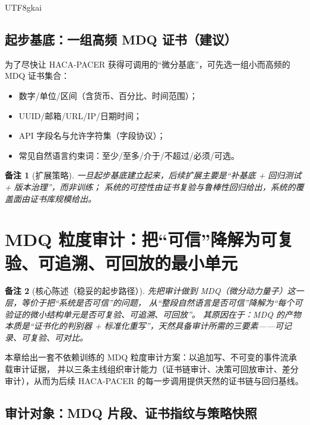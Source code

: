 \documentclass[12pt]{article}
\newtheorem{remark}{备注}[section]
\begin{document}
\begin{CJK*}{UTF8}{gkai}
\subsection{起步基底：一组高频 MDQ 证书（建议）}
\label{subsec:bootstrap-basis}

为了尽快让 HACA-PACER 获得可调用的“微分基底”，可先选一组小而高频的 MDQ 证书集合：
\begin{itemize}
  \item 数字/单位/区间（含货币、百分比、时间范围）；
  \item UUID/邮箱/URL/IP/日期时间；
  \item API 字段名与允许字符集（字段协议）；
  \item 常见自然语言约束词：至少/至多/介于/不超过/必须/可选。
\end{itemize}

\begin{remark}[扩展策略]
一旦起步基底建立起来，后续扩展主要是“补基底 + 回归测试 + 版本治理”，而非训练；
系统的可控性由证书复验与鲁棒性回归给出，系统的覆盖面由证书库规模给出。
\end{remark}

\clearpage

\section{MDQ 粒度审计：把“可信”降解为可复验、可追溯、可回放的最小单元}
\label{sec:mdq-granular-audit}

\begin{remark}[核心陈述（稳妥的起步路径）]
先把审计做到 MDQ（微分动力量子）这一层，等价于把“系统是否可信”的问题，
从“整段自然语言是否可信”降解为“每个可验证的微小结构单元是否可复验、可追溯、可回放”。
其原因在于：MDQ 的产物本质是“证书化的判别器 + 标准化重写”，天然具备审计所需的三要素——可记录、可复验、可对比。
\end{remark}

本章给出一套不依赖训练的 MDQ 粒度审计方案：以追加写、不可变的事件流承载审计证据，
并以三条主线组织审计能力（证书链审计、决策可回放审计、差分审计），从而为后续 HACA-PACER 的每一步调用提供天然的证书链与回归基线。

\subsection{审计对象：MDQ 片段、证书指纹与策略快照}
\label{subsec:audit-objects}


\end{CJK*}
\end{document}
